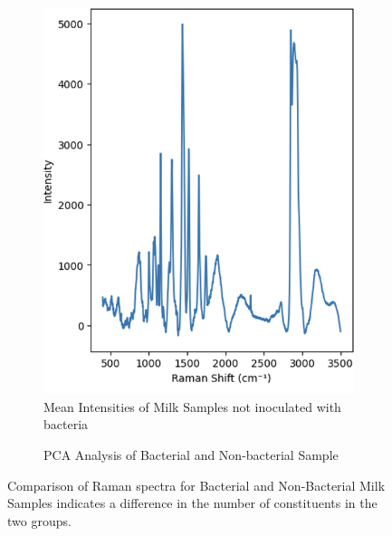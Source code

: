\begin{figure}[htbp]
\begin{subfigure}[b]{0.32\textwidth}
    \includegraphics[width=\linewidth]{Figures/nonbacteria.png}
    \caption{Mean Intensities of Milk Samples not inoculated with bacteria}
    \label{fig:nobacteria}
  \end{subfigure}
  \hfill
  \begin{subfigure}[b]{0.32\textwidth}
    \centering
    \caption{PCA Analysis of Bacterial and Non-bacterial Sample}
    \label{fig:pcabac}
  \end{subfigure}
  \caption{Comparison of Raman spectra for Bacterial and Non-Bacterial Milk Samples indicates a difference in the number of constituents in the two groups.}
  \label{fig:combined}
\end{figure}




